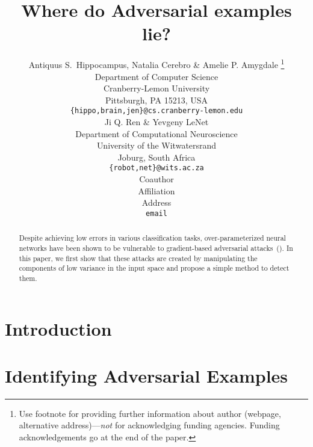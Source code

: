 \documentclass[a4paper]{article}
\title{Where do Adversarial examples lie?}
\author{Antiquus S.~Hippocampus, Natalia Cerebro \& Amelie P. Amygdale \thanks{ Use footnote for providing further information
about author (webpage, alternative address)---\emph{not} for acknowledging
funding agencies.  Funding acknowledgements go at the end of the paper.} \\
Department of Computer Science\\
Cranberry-Lemon University\\
Pittsburgh, PA 15213, USA \\
\texttt{\{hippo,brain,jen\}@cs.cranberry-lemon.edu} \\
\And
Ji Q. Ren \& Yevgeny LeNet \\
Department of Computational Neuroscience \\
University of the Witwatersrand \\
Joburg, South Africa \\
\texttt{\{robot,net\}@wits.ac.za} \\
\AND
Coauthor \\
Affiliation \\
Address \\
\texttt{email}
}
\begin{document}
\maketitle

\begin{abstract}
    Despite achieving low errors in various classification tasks,
    over-parameterized neural networks have been shown to be vulnerable to
    gradient-based adversarial attacks~(\citet{szegedy2013intriguing}). In this paper, we first show that these
    attacks are created by manipulating the components of low variance in the
    input space and propose a simple method to detect them.
\end{abstract}

\section{Introduction}
\label{sec:intro}


\section{Identifying Adversarial Examples}
\label{sec:ident}




\end{document}
